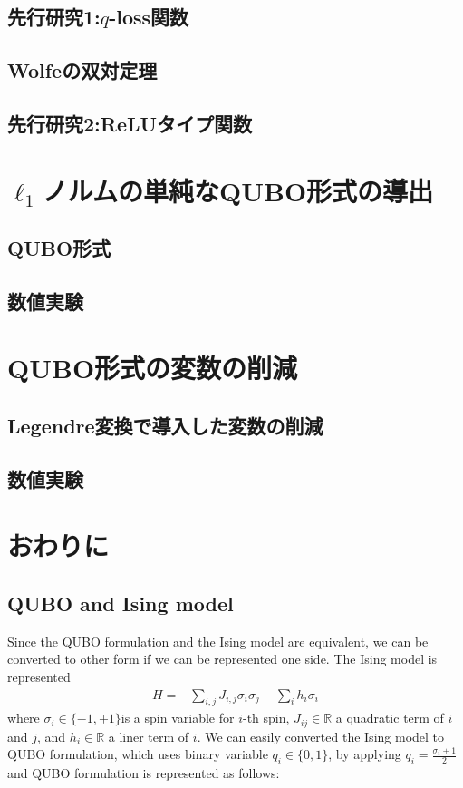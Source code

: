\documentclass[fp,twocolumn]{jpsj3}
\begin{document}
\subsection{先行研究1:$q$-loss関数}
\subsection{Wolfeの双対定理}
\subsection{先行研究2:ReLUタイプ関数}
\section{$\ell_{1}$ノルムの単純なQUBO形式の導出}
\subsection{QUBO形式}
\subsection{数値実験}
\section{QUBO形式の変数の削減}
\subsection{Legendre変換で導入した変数の削減}
\subsection{数値実験}
\section{おわりに}

\subsection{QUBO and Ising model} %
Since the QUBO formulation and the Ising model are equivalent, we can be converted to other form if we can be represented one side. The Ising model is represented 
\begin{eqnarray}
  H=-\sum_{i,j}{J_{i,j}\sigma_{i}\sigma_{j}}-\sum_{i}{h_{i}\sigma_{i}}
\end{eqnarray}
where $\sigma_{i}\in \{-1,+1\}$is a spin variable for $i$-th spin, $J_{ij}\in \mathbb{R}$ a quadratic term of $i$ and $j$, and $h_{i}\in \mathbb{R}$ a liner term of $i$. We can easily converted the Ising model to QUBO formulation, which uses binary variable $q_{i}\in \{0,1\}$, by applying $q_{i}=\frac{\sigma_{i}+1}{2}$ and QUBO formulation is represented as follows:
\end{document}
